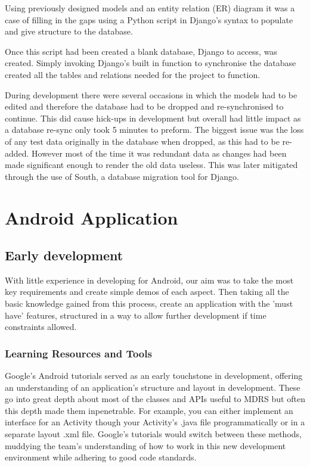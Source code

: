\documentclass{l3proj}
\begin{document}
Using previously designed models and an entity relation (ER) diagram it was a case of filling in the gaps using a \gls{Python} script in Django's syntax to populate and give structure to the database.

Once this script had been created a blank database, Django to access, was created. Simply invoking Django's built in function to synchronise the database created all the tables and relations needed for the project to function.

During development there were several occasions in which the models had to be edited and therefore the database had to be dropped and re-synchronised to continue. This did cause hick-ups in development but overall had little impact as a database re-sync only took 5 minutes to preform. The biggest issue was the loss of any test data originally in the database when dropped, as this had to be re-added. However most of the time it was redundant data as changes had been made significant enough to render the old data useless. This was later mitigated through the use of South, a database migration tool for Django.
\section{Android Application}

\subsection{Early development} With little experience in developing for Android, our aim was to take the most key requirements and create simple demos of each aspect. Then taking all the basic knowledge gained from this process, create an application with the 'must have' features, structured in a way to allow further development if time constraints allowed.

\subsubsection{Learning Resources and Tools} Google's Android tutorials served as an early touchstone in development, offering an understanding of an application's structure and layout in development. These go into great depth about most of the classes and APIs useful to MDRS but often this depth made them inpenetrable. For example, you can either implement an interface for an Activity though your Activity's .java file programmatically or in a separate layout .xml file. Google's tutorials would switch between these methods, muddying the team's understanding of how to work in this new development environment while adhering to good code standards.
\end{document}
